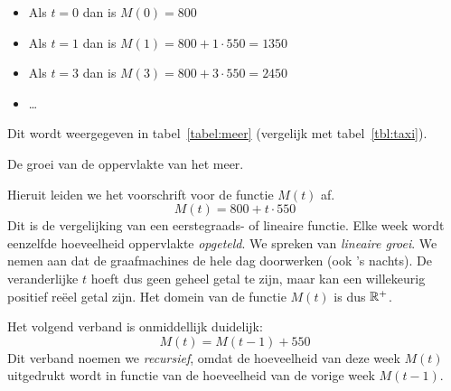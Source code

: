 \begin{itemize}
    \item  Als $t=0$ dan is $M(0)=800$

    \item  Als $t=1$ dan is $M(1)=800+1\cdot 550=1350$

    \item  Als $t=3$ dan is $M(3)=800+3\cdot 550=2450$

    \item  \ldots
\end{itemize}
 Dit wordt weergegeven in tabel~\ref{tabel:meer} (vergelijk met tabel~\ref{tbl:taxi}).
 \begin{table}[htb]
    \centering
    \vspace{0.3cm}
        \caption{De groei van de oppervlakte  van het meer.}
\label{tabel:meer}
 \end{table}
 
\noindent
Hieruit leiden we  het voorschrift voor de functie $M(t)$ af.
\begin{displaymath}
    M(t)=800+t\cdot 550
\end{displaymath}
Dit is de vergelijking van  een eerstegraads- of lineaire functie. Elke week wordt  eenzelfde hoeveelheid oppervlakte \emph{opgeteld}. We spreken van \emph{lineaire groei}. We nemen aan dat de graafmachines de hele dag doorwerken (ook 's nachts). De veranderlijke $t$ hoeft dus geen geheel getal te zijn, maar kan een willekeurig positief reëel getal zijn. Het domein van de functie $M(t)$ is dus $\mathbb{R}^+$. 


Het volgend verband is onmiddellijk duidelijk:
\begin{displaymath}
    M(t)=M(t-1) +550
\end{displaymath}
 Dit verband noemen we \emph{recursief}, omdat de hoeveelheid van deze  week $M(t)$ uitgedrukt wordt in functie van de hoeveelheid van de vorige week $M(t-1)$.

